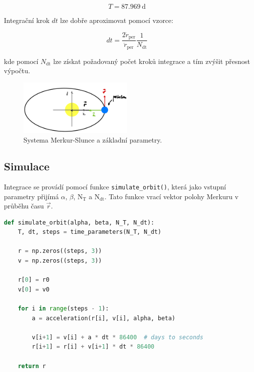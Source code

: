 \documentclass[a4paper,11pt,twocolumn]{article}
\begin{document}
            \begin{equation}
                T = 87.969 ~\text{d}
                \label{eq:mer_period}
            \end{equation}  

            Integrační krok $dt$ lze dobře aproximovat pomocí vzorce:

            \begin{equation}
                dt = \frac{2 \dot{r}_{\text{per}}}{\ddot{r}_{\text{per}}} \frac{1}{N_{\text{dt}}}
                \label{eq:dt}
            \end{equation}

            kde pomocí $N_{\text{dt}}$ lze získat požadovaný počet kroků integrace a tím zvýšit přesnost výpočtu.

            \begin{figure}
                \centering
                \includegraphics[width=0.5\textwidth]{ms_scheme.png}
                \caption{Systema Merkur-Slunce a základní parametry.}
                \label{fig:ms_scheme}
            \end{figure}

        \subsection{Simulace}
            Integrace se provádí pomocí funkce \texttt{simulate\_orbit()}, která jako vstupní parametry přijímá $\alpha$, $\beta$, $\text{N}_\text{T}$ a $\text{N}_\text{dt}$. Tato funkce vrací vektor polohy Merkuru v průběhu času $\vec{r}$. 
            
            
\begin{lstlisting}[language=Python, caption={Simulace oběhu}]      
def simulate_orbit(alpha, beta, N_T, N_dt):
    T, dt, steps = time_parameters(N_T, N_dt)
    
    r = np.zeros((steps, 3))
    v = np.zeros((steps, 3))
    
    r[0] = r0
    v[0] = v0
    
    for i in range(steps - 1):
        a = acceleration(r[i], v[i], alpha, beta)

        v[i+1] = v[i] + a * dt * 86400  # days to seconds
        r[i+1] = r[i] + v[i+1] * dt * 86400

    return r    
\end{lstlisting}
            
\end{document}
